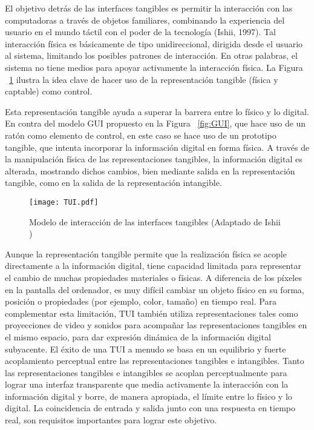 El objetivo detrás de las interfaces tangibles es permitir la interacción con las computadoras a través de objetos familiares, combinando la experiencia del usuario en el mundo táctil con el poder de la tecnología (Ishii, 1997).
Tal interacción física es básicamente de tipo unidireccional, dirigida desde el usuario al sistema, limitando los posibles patrones de interacción. En otras palabras, el sistema no tiene medios para apoyar activamente la interacción física.
La Figura ~\ref{fig:TUI} ilustra la idea clave de hacer uso de la representación tangible (física y captable) como control.

Esta representación tangible ayuda a superar la barrera entre lo físico y lo digital. En contra del modelo GUI propuesto en la Figura ~\ref{fig:GUI}, que hace uso de un ratón como elemento de control, en este caso se hace uso de un prototipo tangible, que intenta incorporar la información digital en forma física. A través de la manipulación física de las representaciones tangibles, la información digital es alterada, mostrando dichos cambios, bien mediante salida en la representación tangible, como en la salida de la representación intangible.


\begin{figure}[!h]
\begin{center}
\texttt{[image: TUI.pdf]}
\caption{Modelo de interacción de las interfaces tangibles (Adaptado de Ishii \cite{Ishii})}
\label{fig:TUI}
\end{center}
\end{figure}


Aunque la representación tangible permite que la realización física se acople directamente a la información digital, tiene capacidad limitada para representar el cambio de muchas propiedades materiales o físicas. A diferencia de los píxeles en la pantalla del ordenador, es muy difícil cambiar un objeto físico en su forma, posición o propiedades (por ejemplo, color, tamaño) en tiempo real. Para complementar esta limitación, TUI también utiliza representaciones tales como proyecciones de video y sonidos para acompañar las representaciones tangibles en el mismo espacio, para dar expresión dinámica de la información digital subyacente.
El éxito de una TUI a menudo se basa en un equilibrio y fuerte acoplamiento perceptual entre las
representaciones tangibles e intangibles. Tanto las representaciones tangibles e intangibles se acoplan perceptualmente para lograr una interfaz transparente que media activamente la interacción con la información digital y borre, de manera apropiada, el límite entre lo físico y lo digital. La coincidencia de entrada y salida junto con una respuesta en tiempo real, son requisitos importantes para lograr este objetivo.


